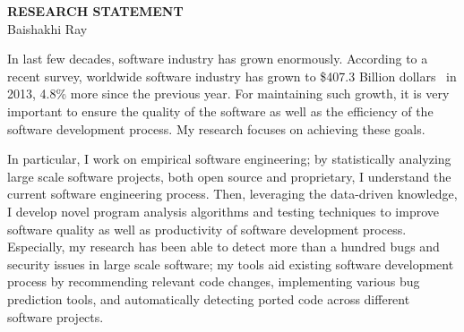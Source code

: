 \documentclass[a4paper, 11pt]{article}
\begin{document}
\thispagestyle{fancy}
\lhead{}
\rhead{}


\pagestyle{fancy}
\rhead{\grayline{\thepage/\totalpages{}}}

\begin{small}

\begin{center}
{\large \bf RESEARCH STATEMENT}\\
\vspace*{0.4cm}
{\normalsize Baishakhi Ray}%
\end{center}

In last few decades, software industry has grown enormously. According to a recent survey,
worldwide software industry has grown to \$407.3 Billion dollars~\cite{Gartner13} in 2013,
4.8\% more since the previous year. For maintaining such growth, it is very important to ensure
the quality of the software as well as the efficiency of the software development process. My
research focuses on achieving these goals.  

In particular, I work on {empirical software engineering}; by statistically analyzing large
scale software projects, both open source and proprietary, I understand the current software
engineering process. Then, leveraging the data-driven knowledge, I develop novel program
analysis algorithms and testing techniques to improve software quality as well as productivity
of software development process. Especially, my research has been able to detect more than a
hundred bugs and security issues in large scale software; my tools aid existing software
development process by recommending relevant code changes, implementing various bug prediction
tools, and automatically detecting ported code across different software projects.  

~


\end{small}
\end{document}
